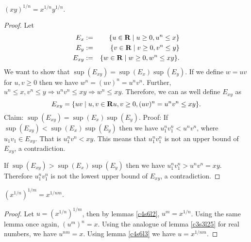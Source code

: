 \begin{lem}\label{c4s6l9}
$(xy)^{1/n} = x^{1/n}y^{1/n}$.
\end{lem}
\begin{proof}
Let
\begin{eqnarray}
E_x &:=& \{u \in \mathbf{R} \;|\; u \ge 0, u^n \le x\} \\
E_y &:=& \{v \in \mathbf{R} \;|\; v \ge 0, v^n \le y\} \\
E_{xy} &:=& \{w \in \mathbf{R} \;|\; w \ge 0, w^n \le xy\}.
\end{eqnarray}
We want to show that $\sup(E_{xy}) = \sup(E_x)\sup(E_y)$. If we define
$w = uv$ for $u, v \ge 0$ then we have $w^n = (uv)^n = u^nv^n$. Further,
$u^n \le x, v^n \le y \Rightarrow u^nv^n \le xy \Rightarrow w^n \le xy$.
Therefore, we can as well define $E_{xy}$ as
\[
E_{xy} = \{uv \;|\; u, v \in \mathbf{R} u, v \ge 0, (uv)^n = u^nv^n\le xy\}.
\]
Claim: $\sup(E_{xy}) = \sup(E_x)\sup(E_y)$.
Proof: If $\sup(E_{xy}) < \sup(E_x)\sup(E_y)$ then we have $u_1^nv_1^n <
u^nv^n$, where $u_1v_1 \in E_{xy}$. That is $u_1^nv^n < xy$. This means 
that $u_1^nv_1^n$ is not an upper bound of $E_{xy}$, a contradiction.

If $\sup(E_{xy}) > \sup(E_x)\sup(E_y)$ then we have $u_1^nv_1^n > u^nv^n
= xy$. Therefore $u_1^nv_1^n$ is not the lowest upper bound of $E_{xy}$,
a contradiction.
\end{proof}

\begin{lem}
$(x^{1/n})^{1/m} = x^{1/nm}$.
\end{lem}
\begin{proof}
Let $u = (x^{1/n})^{1/m}$, then by lemmas \ref{c4s6l2}, $u^m = x^{1/n}$. 
Using the same lemma once again, $(u^m)^n = x$. Using the analogue of 
lemma \ref{c3s3l25} for real numbers, we have $u^{nm} = x$. Using lemma
\ref{c4s6l3} we have $u = x^{1/nm}$.
\end{proof}

